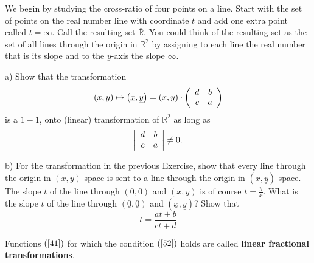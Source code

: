 We begin by studying the cross-ratio of four points on a line. Start with the
set of points on the real number line with coordinate $t$ and add one extra
point called $t=\infty$. Call the resulting set $\overline{\mathbb{R}}$. You
could think of the resulting set as the set of all lines through the origin in
$\mathbb{R}^{2}$ by assigning to each line the real number that is its slope
and to the $y$-axis the slope $\infty$.

\begin{exercise}
a) Show that the transformation%
\[
\left(  x,y\right)  \mapsto\left(  \underline{x},\underline{y}\right)
=\left(  x,y\right)  \cdot\left(
\begin{array}
[c]{cc}%
d & b\\
c & a
\end{array}
\right)
\]
is a $1-1$, onto (linear) transformation of $\mathbb{R}^{2}$ as long as%
\begin{equation}
\left\vert
\begin{array}
[c]{cc}%
d & b\\
c & a
\end{array}
\right\vert \neq0. \label{52}%
\end{equation}


b) For the transformation in the previous Exercise, show that every line
through the origin in $\left(  x,y\right)  $-space is sent to a line through
the origin in $\left(  \underline{x},\underline{y}\right)  $-space. The slope
$t$ of the line through $\left(  0,0\right)  $ and $\left(  x,y\right)  $ is
of course $t=\frac{y}{x}$. What is the slope \underline{$t$} of the line
through $\left(  \underline{0},\underline{0}\right)  $ and $\left(
\underline{x},\underline{y}\right)  $? Show that%
\begin{equation}
\underline{t}=\frac{at+b}{ct+d} \label{41}%
\end{equation}

\end{exercise}

\begin{definition}
Functions $\left(  \ref{41}\right)  $ for which the condition $\left(
\ref{52}\right)  $ holds are called \textbf{linear fractional transformations}.
\end{definition}

